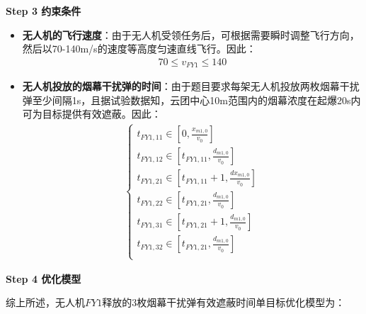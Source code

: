 \documentclass[../main.tex]{subfiles}
\begin{document}
\noindent\textbf{Step 3 约束条件}
\begin{itemize}
\item \textbf{无人机的飞行速度}：由于无人机受领任务后，可根据需要瞬时调整飞行方向，然后以70-140m/s的速度等高度匀速直线飞行。因此：
\begin{align}\label{15.8}
  70 \leq v_{FY1} \leq 140
\end{align}
\item \textbf{无人机投放的烟幕干扰弹的时间}：由于题目要求每架无人机投放两枚烟幕干扰弹至少间隔1s，且据试验数据知，云团中心10m范围内的烟幕浓度在起爆20s内可为目标提供有效遮蔽。因此：
\begin{align}
\begin{cases}
t_{FY1,11}\in \left[ 0,\frac{x_{m1,0}}{v_0} \right]\\
t_{FY1,12}\in \left[ t_{FY1,11},\frac{d_{m1,0}}{v_0} \right]\\
t_{FY1,21}\in \left[ t_{FY1,11}+1,\frac{dx_{m1,0}}{v_0} \right]\\
t_{FY1,22}\in \left[ t_{FY1,21},\frac{d_{m1,0}}{v_0} \right]\\
t_{FY1,31}\in \left[ t_{FY1,21}+1,\frac{d_{m1,0}}{v_0} \right]\\
t_{FY1,32}\in \left[ t_{FY1,21},\frac{d_{m1,0}}{v_0} \right]\\
\end{cases}
\end{align}
\end{itemize}
\textbf{Step 4 优化模型}
\par 综上所述，无人机$FY1$释放的3枚烟幕干扰弹有效遮蔽时间单目标优化模型为：
\end{document}
